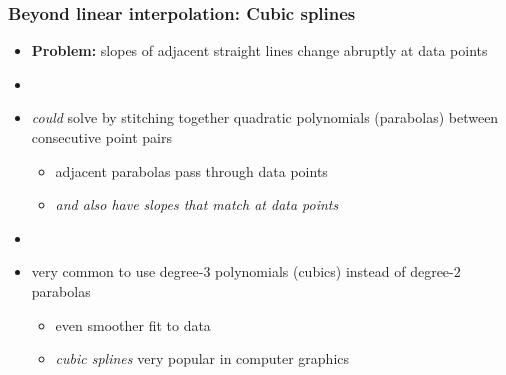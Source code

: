 \documentclass[english,14pt]{beamer}
\newcommand\red[1]{{\color{red} #1}}
\newcommand\blue[1]{{\color{blue} #1}}
\begin{document}

\begin{frame}[fragile]

\frametitle{Beyond linear interpolation: Cubic splines}

\begin{itemize}
	\item[] \textbf{Problem:} slopes of adjacent \blue{straight lines} change abruptly at \red{data points}
	\item[]
	\item \emph{could} solve by stitching together quadratic polynomials (parabolas) between consecutive point pairs
	\begin{itemize}
		\item adjacent parabolas pass through data points
		\item \emph{and also have slopes that match at data points}
	\end{itemize}
	\item[]
	\item very common to use degree-$3$ polynomials (cubics) instead of degree-$2$ parabolas
	\begin{itemize}
		\item even smoother fit to data
		\item \red{\emph{cubic splines}} very popular in computer graphics
	\end{itemize}
	
\end{itemize}

%

\end{frame}
\end{document}

